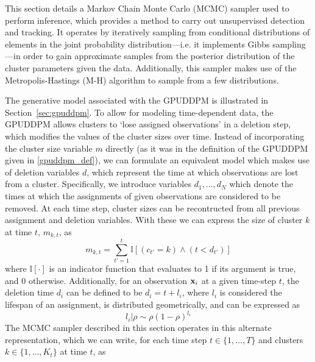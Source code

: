 \documentclass[twocolumn, final]{svjour3}
\begin{document}
This section details a Markov Chain Monte Carlo (MCMC) sampler used to perform inference, which provides a method to carry out unsupervised detection and tracking. It operates by iteratively sampling from conditional distributions of elements in the joint probability distribution---i.e. it implements Gibbs sampling---in order to gain approximate samples from the posterior distribution of the cluster parameters given the data. Additionally, this sampler makes use of the Metropolis-Hastings (M-H) algorithm to sample from a few distributions.

The generative model associated with the GPUDDPM is illustrated in Section~\ref{sec:gpuddpm}. To allow for modeling time-dependent data, the GPUDDPM allows clusters to `lose assigned observations' in a deletion step, which modifies the values of the cluster sizes over time. Instead of incorporating the cluster size variable $m$ directly (as it was in the definition of the GPUDDPM given in \eqref{gpuddpm_def}), we can formulate an equivalent model which makes use of deletion variables $d$, which represent the time at which observations are lost from a cluster. Specifically, we introduce variables $d_{1}, \ldots, d_{N}$ which denote the times at which the assignments of given observations are considered to be removed. At each time step, cluster sizes can be recontructed from all previous assignment and deletion variables. With these we can express the size of cluster $k$ at time $t$, $m_{k,t}$, as
\begin{equation}
\label{compute_clust_size}
m_{k,t} = \sum_{t' = 1}^{t} \mathbb{I}[(c_{t'}=k) \wedge (t < d_{t'})]
\end{equation}
where $\mathbb{I}[\cdot]$ is an indicator function that evaluates to 1 if its argument is true, and 0 otherwise. Additionally, for an observation $\bold{x}_{i}$ at a given time-step $t$, the deletion time $d_{i}$ can be defined to be $d_{i} = t + l_{i}$, where $l_{i}$ is considered the lifespan of an assignment, is distributed geometrically, and can be expressed as
\begin{equation}
\label{del_rho_form}
l_{i} | \rho  \sim  \rho(1 - \rho)^{l_{i}}
\end{equation}
The MCMC sampler described in this section operates in this alternate representation, which we can write, for each time step $t \in \{1, \ldots, T\}$ and clusters $k \in \{ 1, \ldots, K_{t} \} $ at time $t$, as
\end{document}
